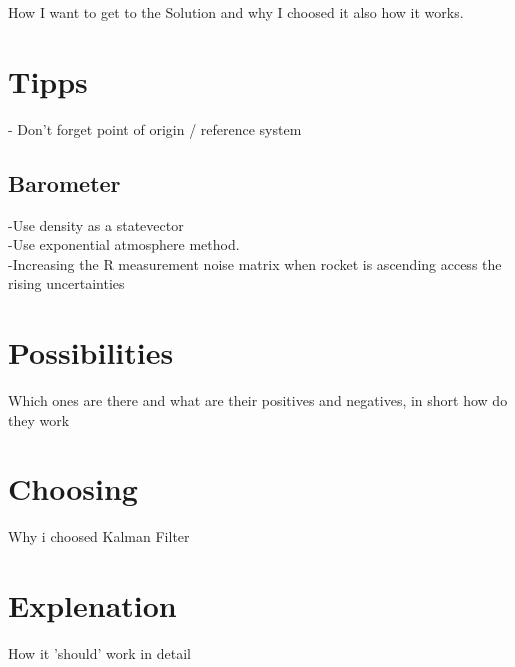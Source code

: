 
  How I want to get to the Solution and why I choosed it also how it works.
  
  \section{Tipps}
  - Don't forget point of origin / reference system
  
  \subsection{Barometer}
  -Use density as a statevector \\
  -Use exponential atmosphere method. \\
  -Increasing the R measurement noise matrix when rocket is ascending access the rising uncertainties
  
  
  \section{Possibilities}
  Which ones are there and what are their positives and negatives, in short how do they work
  
  \section{Choosing}
  Why i choosed Kalman Filter
  
  \section{Explenation}
  How it 'should' work in detail
  
